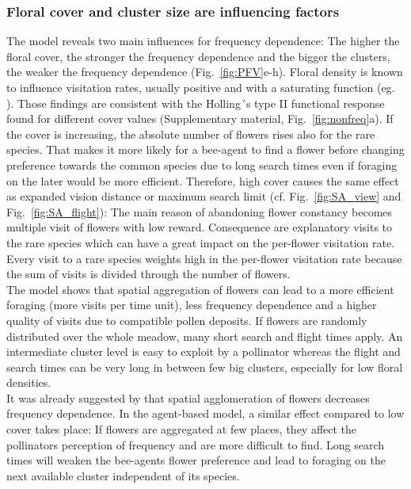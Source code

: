 

\subsubsection*{Floral cover and cluster size are influencing factors}
The model reveals two main influences for frequency dependence: The higher the floral cover, the stronger the frequency dependence and the bigger the clusters, the weaker the frequency dependence (Fig.~\ref{fig:PFV}e-h). 
Floral density is known to influence visitation rates, usually positive and with a saturating function (eg. \citealt{rathcke1983competition,essenberg2012explaining,bernhardt2008effects,Kunin1997}). Those findings are consistent with the Holling´s type II functional response found for different cover values (Supplementary material, Fig.~\ref{fig:nonfreq}a). If the cover is increasing, the absolute number of flowers rises also for the rare species. That makes it more likely for a bee-agent to find a flower before changing preference towards the common species due to long search times even if foraging on the later would be more efficient. Therefore, high cover causes the same effect as expanded vision distance or maximum search limit (cf. Fig.~\ref{fig:SA_view} and Fig.~\ref{fig:SA_flight}): The main reason of abandoning flower constancy becomes multiple visit of flowers with low reward. Consequence are explanatory visits to the rare species which can have a great impact on the per-flower visitation rate. Every visit to a rare species weights high in the per-flower visitation rate because the sum of visits is divided through the number of flowers.\\ 

The model shows that spatial aggregation of flowers can lead to a more efficient foraging (more visits per time unit), less frequency dependence and a higher quality of visits due to compatible pollen deposits. If flowers are randomly distributed over the whole meadow, many short search and flight times apply. An intermediate cluster level is easy to exploit by a pollinator whereas the flight and search times can be very long in between few big clusters, especially for low floral densities. \\
It was already suggested by \cite{epperson1987frequency} that spatial agglomeration of flowers decreases frequency dependence. In the agent-based model, a similar effect compared to low cover takes place: If flowers are aggregated at few places, they affect the pollinators perception of frequency and are more difficult to find. Long search times will weaken the bee-agents flower preference and lead to foraging on the next available cluster independent of its species. 

